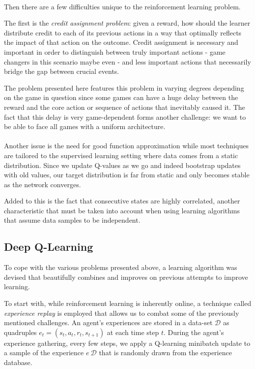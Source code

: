 \paragraph{}
Then there are a few difficulties
unique to the reinforcement learning problem.

The first is the \textit{credit assignment problem}:
given a reward,
how should the learner distribute credit to each of its previous actions
in a way that optimally reflects the impact of that action on the outcome.
Credit assignment is necessary and important
in order to distinguish between truly important actions
- game changers in this scenario maybe even -
and less important actions
that necessarily bridge the gap between crucial events.

The problem presented here features this problem
in varying degrees depending on the game in question
since some games can have a huge delay between
the reward and the core action or sequence of actions
that inevitably caused it.
The fact that this delay is very game-dependent
forms another challenge:
we want to be able to face all games with a uniform architecture.

\paragraph{}
Another issue is the need for good function approximation
while most techniques are tailored to the supervised learning setting
where data comes from a static distribution.
Since we update Q-values as we go
and indeed bootstrap updates with old values,
our target distribution is far from static and only becomes stable
as the network converges.

Added to this is the fact that consecutive states
are highly correlated,
another characteristic that must be taken into account
when using learning algorithms
that assume data samples to be independent.

\subsection{Deep Q-Learning}
\label{sub:deep_q_learning}
To cope with the various problems presented above,
a learning algorithm was devised that beautifully combines
and improves on previous attempts to improve learning.

To start with,
while reinforcement learning is inherently online,
a technique called \textit{experience replay} \parencite{lin1993}
is employed that allows us to combat some of the previously mentioned challenges.
An agent's experiences are stored in a data-set $\mathcal{D}$
as quadruples $e_t = (s_t, a_t, r_t, s_{t+1})$
at each time step $t$.
During the agent's experience gathering,
every few steps,
we apply a Q-learning minibatch update to a sample of the experience
$e ~ \mathcal{D}$
that is randomly drawn from the experience database.

